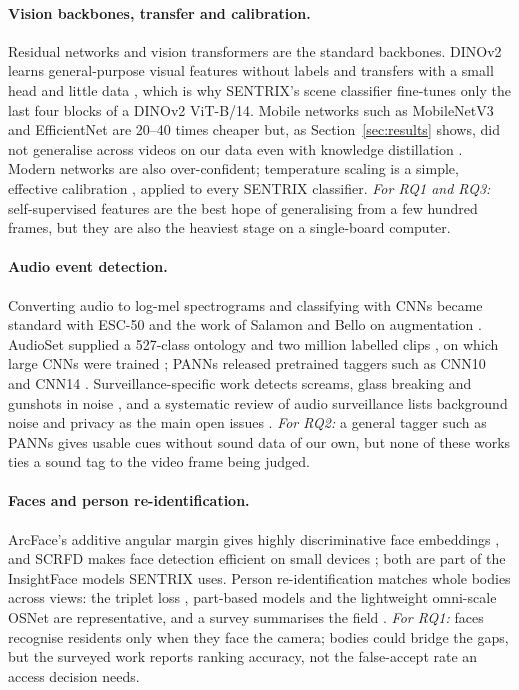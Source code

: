 \paragraph{Vision backbones, transfer and calibration.} Residual networks \cite{he2016resnet} and vision transformers \cite{dosovitskiy2021vit} are the standard backbones. DINOv2 learns general-purpose visual features without labels and transfers with a small head and little data \cite{oquab2024dinov2}, which is why SENTRIX's scene classifier fine-tunes only the last four blocks of a DINOv2 ViT-B/14. Mobile networks such as MobileNetV3 \cite{howard2019mobilenetv3} and EfficientNet \cite{tan2019efficientnet} are 20--40 times cheaper but, as Section~\ref{sec:results} shows, did not generalise across videos on our data even with knowledge distillation \cite{hinton2015distilling}. Modern networks are also over-confident; temperature scaling is a simple, effective calibration \cite{guo2017calibration}, applied to every SENTRIX classifier. \emph{For RQ1 and RQ3:} self-supervised features are the best hope of generalising from a few hundred frames, but they are also the heaviest stage on a single-board computer.

\paragraph{Audio event detection.} Converting audio to log-mel spectrograms and classifying with CNNs became standard with ESC-50 \cite{piczak2015esc} and the work of Salamon and Bello on augmentation \cite{salamon2017deep}. AudioSet supplied a 527-class ontology and two million labelled clips \cite{gemmeke2017audioset}, on which large CNNs were trained \cite{hershey2017cnn}; PANNs released pretrained taggers such as CNN10 and CNN14 \cite{kong2020panns}. Surveillance-specific work detects screams, glass breaking and gunshots in noise \cite{foggia2015audio}, and a systematic review of audio surveillance lists background noise and privacy as the main open issues \cite{crocco2016audio}. \emph{For RQ2:} a general tagger such as PANNs gives usable cues without sound data of our own, but none of these works ties a sound tag to the video frame being judged.

\paragraph{Faces and person re-identification.} ArcFace's additive angular margin gives highly discriminative face embeddings \cite{deng2019arcface}, and SCRFD makes face detection efficient on small devices \cite{guo2022scrfd}; both are part of the InsightFace models SENTRIX uses. Person re-identification matches whole bodies across views: the triplet loss \cite{hermans2017triplet}, part-based models \cite{sun2018pcb} and the lightweight omni-scale OSNet \cite{zhou2019osnet} are representative, and a survey summarises the field \cite{ye2022reid}. \emph{For RQ1:} faces recognise residents only when they face the camera; bodies could bridge the gaps, but the surveyed work reports ranking accuracy, not the false-accept rate an access decision needs.

